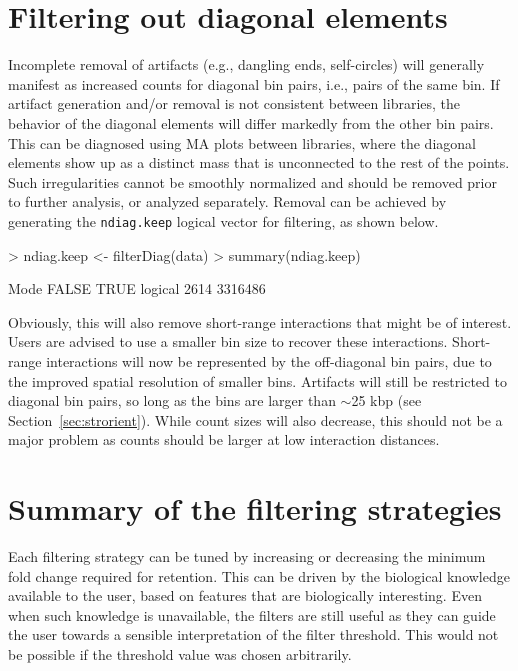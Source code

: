 \documentclass[12pt]{report}
\renewenvironment{Schunk}{\vspace{0pt}}{\vspace{0pt}}
\newcommand{\code}[1]{{\small\texttt{#1}}}
\begin{document}
\section{Filtering out diagonal elements}
Incomplete removal of artifacts (e.g., dangling ends, self-circles) will generally manifest as increased counts for diagonal bin pairs, i.e., pairs of the same bin.
If artifact generation and/or removal is not consistent between libraries, the behavior of the diagonal elements will differ markedly from the other bin pairs.
This can be diagnosed using MA plots between libraries, where the diagonal elements show up as a distinct mass that is unconnected to the rest of the points.
Such irregularities cannot be smoothly normalized and should be removed prior to further analysis, or analyzed separately.
Removal can be achieved by generating the \code{ndiag.keep} logical vector for filtering, as shown below.

\begin{Schunk}
\begin{Sinput}
> ndiag.keep <- filterDiag(data)
> summary(ndiag.keep)
\end{Sinput}
\begin{Soutput}
   Mode   FALSE    TRUE 
logical    2614 3316486 
\end{Soutput}
\end{Schunk}

Obviously, this will also remove short-range interactions that might be of interest.
Users are advised to use a smaller bin size to recover these interactions.
Short-range interactions will now be represented by the off-diagonal bin pairs, due to the improved spatial resolution of smaller bins.
Artifacts will still be restricted to diagonal bin pairs, so long as the bins are larger than $\sim$25 kbp (see Section~\ref{sec:strorient}).
While count sizes will also decrease, this should not be a major problem as counts should be larger at low interaction distances. 

\section{Summary of the filtering strategies}
Each filtering strategy can be tuned by increasing or decreasing the minimum fold change required for retention.
This can be driven by the biological knowledge available to the user, based on features that are biologically interesting.
Even when such knowledge is unavailable, the filters are still useful as they can guide the user towards a sensible interpretation of the filter threshold.
This would not be possible if the threshold value was chosen arbitrarily.
\end{document}
